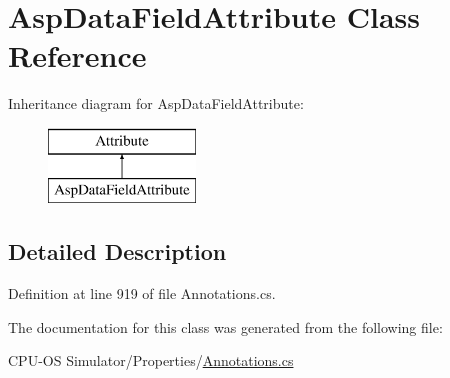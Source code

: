 \hypertarget{class_asp_data_field_attribute}{}\section{Asp\+Data\+Field\+Attribute Class Reference}
\label{class_asp_data_field_attribute}
Inheritance diagram for Asp\+Data\+Field\+Attribute\+:\begin{figure}[H]
\begin{center}
\leavevmode
\includegraphics[height=2.000000cm]{class_asp_data_field_attribute}
\end{center}
\end{figure}


\subsection{Detailed Description}


Definition at line 919 of file Annotations.\+cs.



The documentation for this class was generated from the following file\+:\begin{DoxyCompactItemize}
\item 
C\+P\+U-\/\+O\+S Simulator/\+Properties/\hyperlink{_annotations_8cs}{Annotations.\+cs}\end{DoxyCompactItemize}
